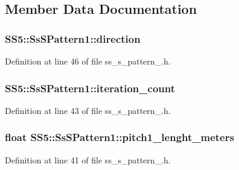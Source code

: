 \subsection{Member Data Documentation}
\subsubsection[{\texorpdfstring{direction}{direction}}]{ S\+S5\+::\+Ss\+S\+Pattern1\+::direction}\hypertarget{structSS5_1_1SsSPattern1_aaf02559c717760bb2711dd53101c833b}{}\label{structSS5_1_1SsSPattern1_aaf02559c717760bb2711dd53101c833b}


Definition at line 46 of file ss\+\_\+s\+\_\+pattern\+\_.\+h.

\subsubsection[{\texorpdfstring{iteration\+\_\+count}{iteration_count}}]{ S\+S5\+::\+Ss\+S\+Pattern1\+::iteration\+\_\+count}\hypertarget{structSS5_1_1SsSPattern1_ae25d530c02b2ee05d7f83dacc88446cb}{}\label{structSS5_1_1SsSPattern1_ae25d530c02b2ee05d7f83dacc88446cb}


Definition at line 43 of file ss\+\_\+s\+\_\+pattern\+\_.\+h.

\subsubsection[{\texorpdfstring{pitch1\+\_\+lenght\+\_\+meters}{pitch1_lenght_meters}}]{\setlength{\rightskip}{0pt plus 5cm}float S\+S5\+::\+Ss\+S\+Pattern1\+::pitch1\+\_\+lenght\+\_\+meters}\hypertarget{structSS5_1_1SsSPattern1_aebb7e39c6c0c4ae0632ea88eb2e5857f}{}\label{structSS5_1_1SsSPattern1_aebb7e39c6c0c4ae0632ea88eb2e5857f}


Definition at line 41 of file ss\+\_\+s\+\_\+pattern\+\_.\+h.

